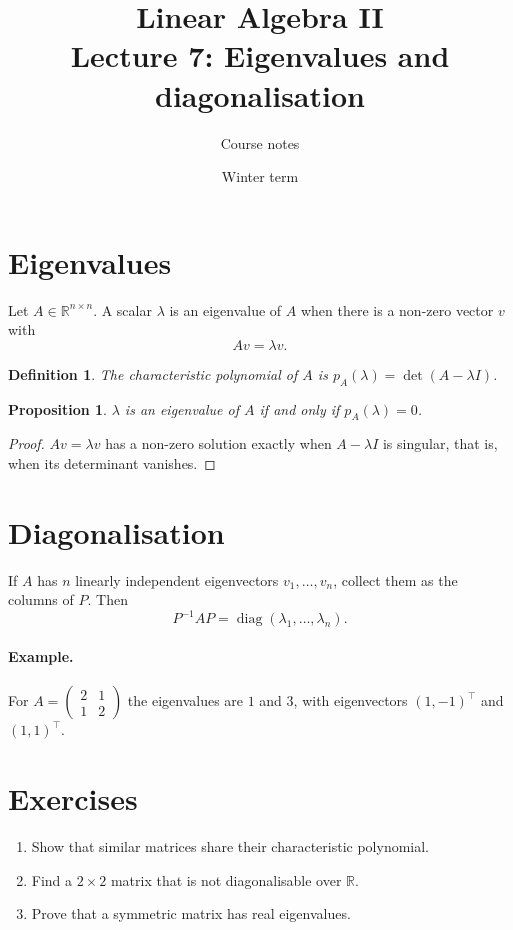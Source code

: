 \documentclass[11pt]{article}
\title{Linear Algebra II\\\large Lecture 7: Eigenvalues and diagonalisation}
\author{Course notes}
\date{Winter term}
\newtheorem{definition}{Definition}
\newtheorem{proposition}{Proposition}
\begin{document}
\maketitle

\section{Eigenvalues}
Let $A \in \mathbb{R}^{n \times n}$. A scalar $\lambda$ is an eigenvalue of
$A$ when there is a non-zero vector $v$ with
\begin{equation}
  A v = \lambda v .
\end{equation}

\begin{definition}
The characteristic polynomial of $A$ is $p_A(\lambda) = \det(A - \lambda I)$.
\end{definition}

\begin{proposition}
$\lambda$ is an eigenvalue of $A$ if and only if $p_A(\lambda) = 0$.
\end{proposition}

\begin{proof}
$A v = \lambda v$ has a non-zero solution exactly when $A - \lambda I$ is
singular, that is, when its determinant vanishes.
\end{proof}

\section{Diagonalisation}
If $A$ has $n$ linearly independent eigenvectors $v_1, \dots, v_n$, collect
them as the columns of $P$. Then
\begin{equation}
  P^{-1} A P = \operatorname{diag}(\lambda_1, \dots, \lambda_n).
\end{equation}

\paragraph{Example.} For
$A = \begin{pmatrix} 2 & 1 \\ 1 & 2 \end{pmatrix}$ the eigenvalues are
$1$ and $3$, with eigenvectors $(1,-1)^\top$ and $(1,1)^\top$.

\section{Exercises}
\begin{enumerate}
  \item Show that similar matrices share their characteristic polynomial.
  \item Find a $2 \times 2$ matrix that is not diagonalisable over $\mathbb{R}$.
  \item Prove that a symmetric matrix has real eigenvalues.
\end{enumerate}
\end{document}
